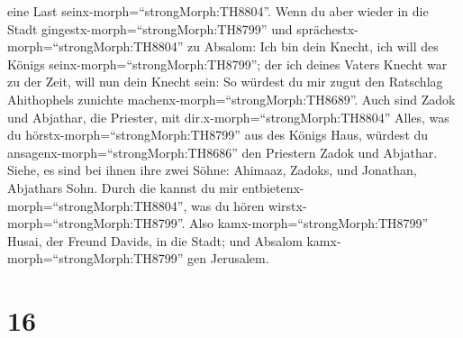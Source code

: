 eine Last seinx-morph=``strongMorph:TH8804''.  Wenn du aber
wieder in die Stadt gingestx-morph=``strongMorph:TH8799'' und
sprächestx-morph=``strongMorph:TH8804'' zu Absalom: Ich bin dein Knecht,
ich will des Königs seinx-morph=``strongMorph:TH8799''; der ich deines
Vaters Knecht war zu der Zeit, will nun dein Knecht sein: So würdest du
mir zugut den Ratschlag Ahithophels zunichte
machenx-morph=``strongMorph:TH8689''.  Auch sind Zadok und
Abjathar, die Priester, mit dir.x-morph=``strongMorph:TH8804'' Alles,
was du hörstx-morph=``strongMorph:TH8799'' aus des Königs Haus, würdest
du ansagenx-morph=``strongMorph:TH8686'' den Priestern Zadok und
Abjathar.  Siehe, es sind bei ihnen ihre zwei Söhne:
Ahimaaz, Zadoks, und Jonathan, Abjathars Sohn. Durch die kannst du mir
entbietenx-morph=``strongMorph:TH8804'', was du hören
wirstx-morph=``strongMorph:TH8799''.  Also
kamx-morph=``strongMorph:TH8799'' Husai, der Freund Davids, in die
Stadt; und Absalom kamx-morph=``strongMorph:TH8799'' gen Jerusalem.

\hypertarget{section-15}{%
\section{16}\label{section-15}}

